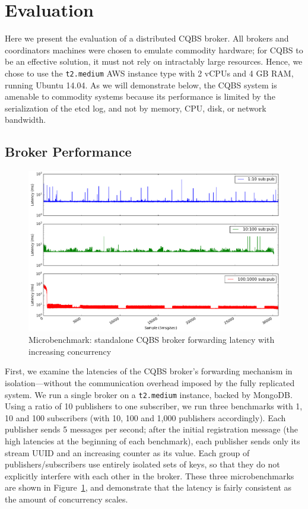 \section{Evaluation}
\label{section:evaluation}

Here we present the evaluation of a distributed CQBS broker.
All brokers and coordinators machines were chosen to emulate commodity hardware; for CQBS to be an effective solution, it must not rely on intractably large resources.
Hence, we chose to use the \texttt{t2.medium} AWS instance type with 2 vCPUs and 4 GB RAM, running Ubuntu 14.04.
As we will demonstrate below, the CQBS system is amenable to commodity systems because its performance is limited by the serialization of the etcd log, and not by memory, CPU, disk, or network bandwidth.

\subsection{Broker Performance}

\begin{figure}[t]
\centering
\includegraphics[width=\linewidth]{figs/singlenodelatency.png}
\caption{Microbenchmark: standalone CQBS broker forwarding latency with increasing concurrency}
\label{fig:singlenodelatency}
\end{figure}

First, we examine the latencies of the CQBS broker's forwarding mechanism in isolation---without the communication overhead imposed by the fully replicated system.
We run a single broker on a \texttt{t2.medium} instance, backed by MongoDB\@.
Using a ratio of 10 publishers to one subscriber, we run three benchmarks with 1, 10 and 100 subscribers (with 10, 100 and 1,000 publishers accordingly).
Each publisher sends 5 messages per second; after the initial registration message (the high latencies at the beginning of each benchmark), each publisher sends only its stream UUID and an increasing counter as its value.
Each group of publishers/subscribers use entirely isolated sets of keys, so that they do not explicitly interfere with each other in the broker.
These three microbenchmarks are shown in Figure~\ref{fig:singlenodelatency}, and demonstrate that the latency is fairly consistent as the amount of concurrency scales.


